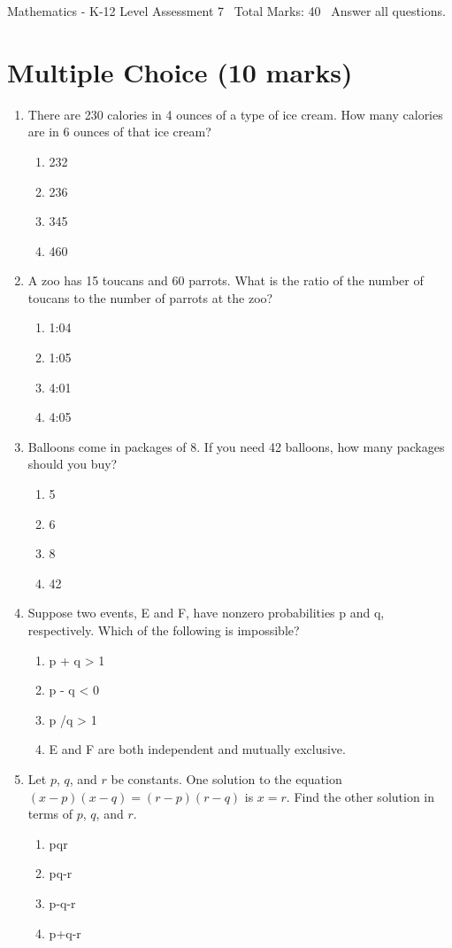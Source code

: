 \documentclass[12pt]{article}
\begin{document}
\begin{center}
Mathematics - K-12 Level Assessment 7 \
Total Marks: 40 \
Answer all questions.
\end{center}

\section*{Multiple Choice (10 marks)}
\begin{enumerate}[label=\arabic*.]
\item There are 230 calories in 4 ounces of a type of ice cream. How many calories are in 6 ounces of that ice cream?
\begin{enumerate}[label=(\alph*)]
    \item 232
    \item 236
    \item 345
    \item 460
\end{enumerate}
\item A zoo has 15 toucans and 60 parrots. What is the ratio of the number of toucans to the number of parrots at the zoo?
\begin{enumerate}[label=(\alph*)]
    \item 1:04
    \item 1:05
    \item 4:01
    \item 4:05
\end{enumerate}
\item Balloons come in packages of 8. If you need 42 balloons, how many packages should you buy?
\begin{enumerate}[label=(\alph*)]
    \item 5
    \item 6
    \item 8
    \item 42
\end{enumerate}
\item Suppose two events, E and F, have nonzero probabilities p and q, respectively. Which of the following is impossible?
\begin{enumerate}[label=(\alph*)]
    \item p + q \textgreater{} 1
    \item p - q \textless{} 0
    \item p /q \textgreater{} 1
    \item E and F are both independent and mutually exclusive.
\end{enumerate}
\item Let $p$, $q$, and $r$ be constants. One solution to the equation $(x-p)(x-q) = (r-p)(r-q)$ is $x=r$. Find the other solution in terms of $p$, $q$, and $r$.
\begin{enumerate}[label=(\alph*)]
    \item pqr
    \item pq-r
    \item p-q-r
    \item p+q-r
\end{enumerate}
\end{enumerate}
\end{document}
